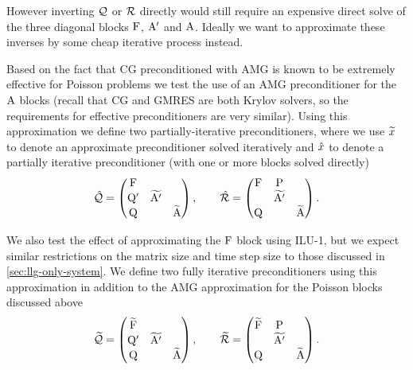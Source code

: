 However inverting $\mathcal{Q}$ or $\mathcal{R}$ directly would still require an expensive direct solve of the three diagonal blocks $\mathrm{F}$, $\mathrm{A}'$ and $\mathrm{A}$.
Ideally we want to approximate these inverses by some cheap iterative process instead.

Based on the fact that CG preconditioned with AMG is known to be extremely effective for Poisson problems we test the use of an AMG preconditioner for the $\mathrm{A}$ blocks (recall that CG and GMRES are both Krylov solvers, so the requirements for effective preconditioners are very similar).
Using this approximation we define two partially-iterative preconditioners, where we use $\widetilde{x}$ to denote an approximate preconditioner solved iteratively and $\hat{x}$ to denote a partially iterative preconditioner (\ie with one or more blocks solved directly)
\begin{equation}
  \hat{\mathcal{Q}} =
  \begin{pmatrix}
    \mathrm{F}       &           &  \\
    \mathrm{Q}'       & \widetilde{\mathrm{A}'} &   \\
    \mathrm{Q}       &           &   \widetilde{\mathrm{A}}
  \end{pmatrix},
  \qquad
  \hat{\mathcal{R}} =
  \begin{pmatrix}
    \mathrm{F}       & \mathrm{P}       &  \\
    & \widetilde{\mathrm{A}'} &   \\
    \mathrm{Q}       &           &  \widetilde{\mathrm{A}}
  \end{pmatrix}.
  \label{eq:ms-block-prec-drop-p}
\end{equation}

We also test the effect of approximating the $\mathrm{F}$ block using ILU-1, but we expect similar restrictions on the matrix size and time step size to those discussed in \cref{sec:llg-only-system}.
We define two fully iterative preconditioners using this approximation in addition to the AMG approximation for the Poisson blocks discussed above
\begin{equation}
  \widetilde{\mathcal{Q}} =
  \begin{pmatrix}
    \widetilde{\mathrm{F}} &           &  \\
    \mathrm{Q}'       & \widetilde{\mathrm{A}'} &   \\
    \mathrm{Q}       &           &   \widetilde{\mathrm{A}}
  \end{pmatrix},
  \qquad
  \widetilde{\mathcal{R}} =
  \begin{pmatrix}
   \widetilde{\mathrm{F}}       & \mathrm{P}       &  \\
    & \widetilde{\mathrm{A}'} &   \\
    \mathrm{Q}       &           &  \widetilde{\mathrm{A}}
  \end{pmatrix}.
  \label{eq:ms-block-prec-drop-p}
\end{equation}


